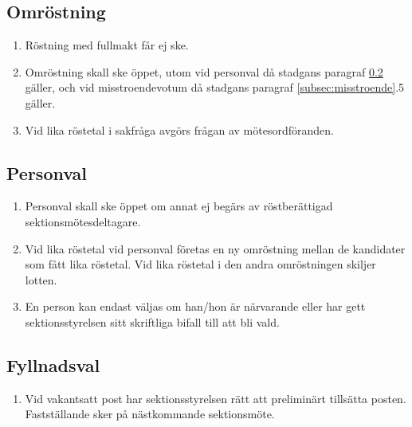 \documentclass[11pt,a4paper]{article}
\begin{document}
\subsection{Omröstning}

\begin{enumerate}[\thesubsection .1]

  \item Röstning med fullmakt får ej ske.

  \item Omröstning skall ske öppet, utom vid personval då stadgans
  paragraf \ref{subsec:personval} gäller, och vid misstroendevotum då stadgans paragraf \ref{subsec:misstroende}.5 gäller.

  \item Vid lika röstetal i sakfråga avgörs frågan av mötesordföranden.

\end{enumerate}

\subsection{Personval}

\label{subsec:personval}

\begin{enumerate}[\thesubsection .1]
  
  \item Personval skall ske öppet om annat ej begärs av röstberättigad sektionsmötesdeltagare.
  
  \item Vid lika röstetal vid personval företas en ny omröstning mellan de kandidater som fått lika röstetal. Vid lika röstetal i den andra omröstningen skiljer lotten.
  
  \item En person kan endast väljas om han/hon är närvarande eller har gett sektionsstyrelsen sitt skriftliga bifall till att bli vald.

\end{enumerate}

\subsection{Fyllnadsval}

\begin{enumerate}[\thesubsection .1]

  \item Vid vakantsatt post har sektions\-styr\-elsen rätt att preliminärt tillsätta posten. Fastställande sker på näst\-komm\-ande sektionsmöte.

\end{enumerate}
\end{document}
